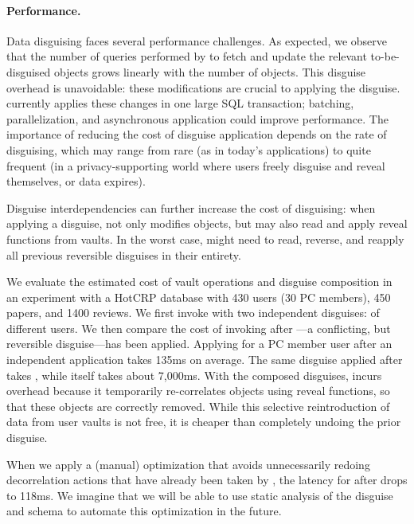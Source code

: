 \paragraph{Performance.}
\label{sec:perf}

Data disguising faces several performance challenges.
%
%
As expected, we observe that the number of queries performed by \sys to fetch and update
the relevant to-be-disguised objects grows linearly with the number of objects.
%
This disguise overhead is unavoidable: these modifications are crucial to applying the
disguise.
%
\sys currently applies these changes in one large SQL transaction; batching, parallelization,
and asynchronous application could improve performance.
%
The importance of reducing the cost of disguise application depends on the rate of
disguising, which may range from rare (as in today's applications) to quite frequent (in a
privacy-supporting world where users freely disguise and reveal themselves, or data expires).
%

%
Disguise interdependencies can further increase the cost of disguising: when applying a
disguise, \sys not only modifies objects, but may also read and apply reveal functions from
vaults.
%
In the worst case, \sys might need to read, reverse, and reapply all previous reversible
disguises in their entirety.
%

We evaluate the estimated cost of vault operations and disguise composition in an experiment
with a HotCRP database with 430 users (30 PC members), 450 papers, and 1400 reviews.
%
We first invoke \sys with two independent disguises: \hrtbf of different users.
%
We then compare the cost of invoking \hrtbf after \hconfanon---a conflicting, but reversible
disguise---has been applied.
%
Applying \hrtbf for a PC member user after an independent \hrtbf application takes 135ms on
average.
%
The same \hrtbf disguise applied after \hconfanon takes
,
while \hconfanon itself takes about 7,000ms.
%
With the composed disguises, \sys incurs overhead because it temporarily re-correlates objects
using reveal functions, so that these objects are correctly removed.
%
While this selective reintroduction of data from user vaults is not free, it is cheaper than
completely undoing the prior \hconfanon disguise.
%

%
When we apply a (manual) optimization that avoids unnecessarily redoing decorrelation
actions that have already been taken by \hconfanon, the latency for \hrtbf after \hconfanon
drops to 118ms.
%
We imagine that we will be able to use static analysis of the disguise and schema to automate
this optimization in the future.
%
